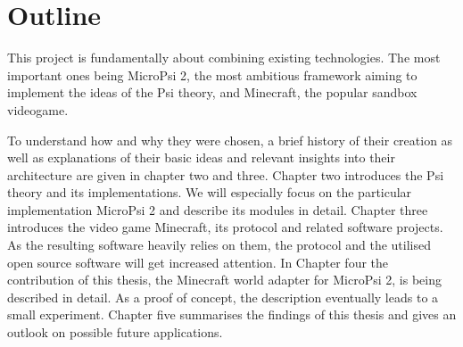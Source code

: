 \section{Outline}
This project is fundamentally about combining existing technologies. The most important ones being MicroPsi 2, the most ambitious framework aiming to implement the ideas of the Psi theory, and Minecraft, the popular sandbox videogame.

To understand how and why they were chosen, a brief history of their creation as well as explanations of their basic ideas and relevant insights into their architecture are given in chapter two and three. Chapter two introduces the Psi theory and its implementations. We will especially focus on the particular implementation MicroPsi 2 and describe its modules in detail. Chapter three introduces the video game Minecraft, its protocol and related software projects. As the resulting software heavily relies on them, the protocol and the utilised open source software will get increased attention. 
In Chapter four the contribution of this thesis, the Minecraft world adapter for MicroPsi 2, is being described in detail. As a proof of concept, the description eventually leads to a small experiment.
Chapter five summarises the findings of this thesis and gives an outlook on possible future applications.